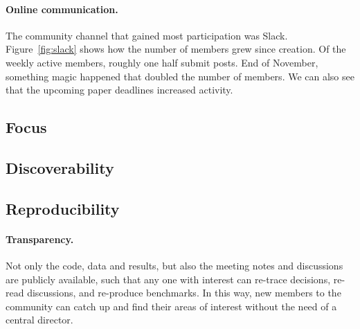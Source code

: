 \documentclass{article} %
\begin{document}
\paragraph{Online communication.} The community channel that gained most participation was Slack. Figure~\ref{fig:slack} shows how the number of members grew since creation. Of the weekly active members, roughly one half submit posts. End of November, something magic happened that doubled the number of members.  
We can also see that the upcoming paper deadlines increased activity. 



\subsection{Focus}
\label{subsec:focus}


\subsection{Discoverability}
\label{subsec:discoverability}

\subsection{Reproducibility}
\label{subsec:reproducibility}

\paragraph{Transparency.} Not only the code, data and results, but also the meeting notes and discussions are publicly available, such that any one with interest can re-trace decisions, re-read discussions, and re-produce benchmarks. In this way, new members to the community can catch up and find their areas of interest without the need of a central director.

\end{document}
